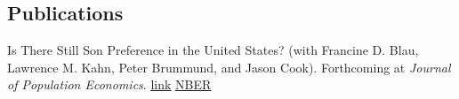 \documentclass[10pt,letterpaper]{article}
\renewenvironment{itemize}{
  \begin{list}{}{
    \setlength{\leftmargin}{1.5em}
    \setlength{\itemsep}{0.25em}
    \setlength{\parskip}{0pt}
    \setlength{\parsep}{0.25em}
  }
}{
  \end{list}
}
\begin{document}
\subsection*{Publications}
\begin{itemize}
\item { Is There Still Son Preference in the United States?} (with Francine D. Blau, Lawrence M. Kahn, Peter Brummund, and Jason Cook). Forthcoming at \textit{Journal of Population Economics}. \href{https://link.springer.com/article/10.1007/s00148-019-00760-7?wt_mc=Internal.Event.1.SEM.ArticleAuthorOnlineFirst&utm_source=ArticleAuthorContributingOnlineFirst&utm_medium=email&utm_content=AA_en_06082018&ArticleAuthorContributingOnlineFirst_20200107}{\underline{link}}  \href{http://www.nber.org/papers/w23816}{\underline{NBER}} 
\end{itemize}
\end{document}
